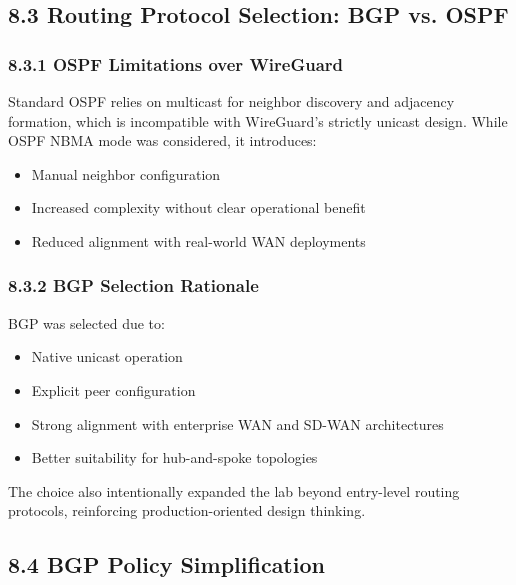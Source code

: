 \documentclass[11pt]{article}
\begin{document}
\subsection{8.3 Routing Protocol Selection: BGP vs. OSPF}
\label{subsec:routing-protocol-selection}

\subsubsection{8.3.1 OSPF Limitations over WireGuard}
\label{subsubsec:ospf-limitations}

Standard OSPF relies on multicast for neighbor discovery and adjacency formation, which is incompatible with WireGuard’s strictly unicast design. While OSPF NBMA mode was considered, it introduces:
\begin{itemize}
\item Manual neighbor configuration
\item Increased complexity without clear operational benefit
\item Reduced alignment with real-world WAN deployments
\end{itemize}

\subsubsection{8.3.2 BGP Selection Rationale}
\label{subsubsec:bgp-selection-rationale}

BGP was selected due to:
\begin{itemize}
\item Native unicast operation
\item Explicit peer configuration
\item Strong alignment with enterprise WAN and SD-WAN architectures
\item Better suitability for hub-and-spoke topologies
\end{itemize}

The choice also intentionally expanded the lab beyond entry-level routing protocols, reinforcing production-oriented design thinking.

%
%
\subsection{8.4 BGP Policy Simplification}
\label{subsec:bgp-policy-simplification}
\end{document}
